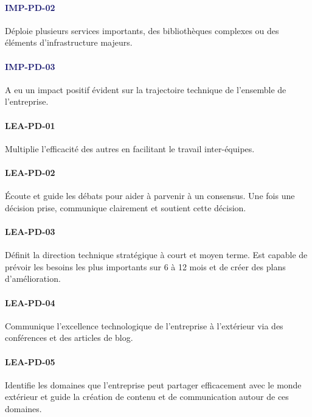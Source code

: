 \documentclass[a4paper, french, openany, 12pt]{book}
\newcommand\wis[1]{\textcolor{MidnightBlue}{\textbf{\uppercase{imp-{#1}}}}}
\newcommand\cha[1]{\textcolor{OliveGreen}{\textbf{\uppercase{lea-{#1}}}}}
\begin{document}
\begin{multicols}{2}
  \paragraph*{\wis{pd-02}}

  Déploie plusieurs services importants, des bibliothèques complexes ou des éléments d'infrastructure majeurs.

  \paragraph*{\wis{pd-03}}

  A eu un impact positif évident sur la trajectoire technique de l'ensemble de l'entreprise.

  \paragraph*{\cha{pd-01}}

  Multiplie l'efficacité des autres en facilitant le travail inter-équipes.

  \paragraph*{\cha{pd-02}}

  Écoute et guide les débats pour aider à parvenir à un consensus.
  Une fois une décision prise, communique clairement et soutient cette décision.

  \paragraph*{\cha{pd-03}}

  Définit la direction technique stratégique à court et moyen terme.
  Est capable de prévoir les besoins les plus importants  sur 6 à 12 mois et de créer des plans d'amélioration.

  \paragraph*{\cha{pd-04}}

  Communique l'excellence technologique de l'entreprise à l'extérieur via des conférences et des articles de blog.

  \paragraph*{\cha{pd-05}}

  Identifie les domaines que l'entreprise peut partager efficacement avec le monde extérieur et guide la création de
  contenu et de communication autour de ces domaines.


\end{multicols}
\end{document}
